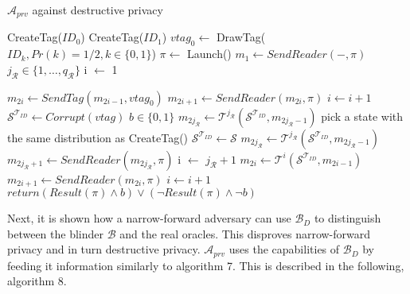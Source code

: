     \begin{algorithm}[H]
        \centering
        \caption{$\mathcal{A}_{prv}$ against destructive privacy}
        \begin{algorithmic}[1] %
            \State CreateTag($ID_0$)
            \State CreateTag($ID_1$)
            \State $vtag_{0} \leftarrow$ DrawTag($ID_k, Pr(k)= 1/2, k \in \{0,1\}$)
            \State $\pi \leftarrow$ Launch() 
            \State $m_1 \leftarrow SendReader(-,\pi)$ 
            \State $j_{\mathcal{R}} \in \{1, \dots, q_\mathcal{R}\}$
            \State i $\leftarrow$ 1

                \State $m_{2i} \gets SendTag(m_{2i-1}, vtag_{0})$
                \State $m_{2i+1} \gets SendReader(m_{2i}, \pi)$
                \State $i \gets i+1$
            \EndWhile
            \State $\mathcal{S}^{\mathcal{T}_{ID}} \gets Corrupt(vtag)$
            \State $b \in \{0,1\}$
                \State $ m_{2j_{\mathcal{R}}} \gets \mathcal{T}^{j_{\mathcal{R}}}(\mathcal{S}^{\mathcal{T}_{ID}}, m_{2j_{\mathcal{R}}-1})$
            \Else
                \State pick a state with the same distribution as CreateTag()
                \State $\mathcal{S}^{\mathcal{T}_{ID}} \gets \mathcal{S}$
                \State $ m_{2j_{\mathcal{R}}} \gets \mathcal{T}^{j_{\mathcal{R}}}(\mathcal{S}^{\mathcal{T}_{ID}}, m_{2j_{\mathcal{R}}-1})$
            \EndIf
            \State $m_{2j_{\mathcal{R}}+1} \gets SendReader(m_{2j_{\mathcal{R}}}, \pi)$ 
            \State i $\leftarrow$ $j_{\mathcal{R}}+1$
                \State $m_{2i} \gets \mathcal{T}^{i}(\mathcal{S}^{\mathcal{T}_{ID}}, m_{2i-1})$
                \State $m_{2i+1} \gets SendReader(m_{2i}, \pi)$
                \State $i \gets i+1$
            \EndWhile       
            \State $return (Result(\pi) \land b) \lor (\lnot Result(\pi) \land \lnot b)$
        \end{algorithmic}
    \end{algorithm}

    Next, it is shown how a narrow-forward adversary can use $\mathcal{B}_D$ to distinguish between the blinder $\mathcal{B}$ and the real oracles. This disproves 
    narrow-forward privacy and in turn destructive privacy. $\mathcal{A}_{prv}$ uses the capabilities of $\mathcal{B}_D$ by feeding it information similarly to 
    algorithm 7. This is described in the following, algorithm 8. 

